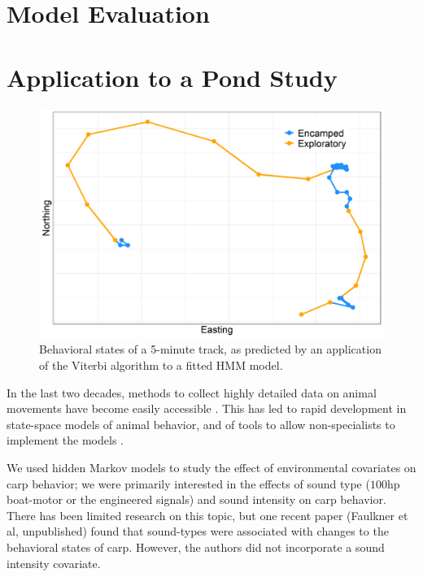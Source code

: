 \documentclass[12pt]{article}
\begin{document}
	\section{Model Evaluation}
	
	\section{Application to a Pond Study} \label{sec:pond_study}
	
	\begin{figure}
		\includegraphics[width=\textwidth]{track_states.png}
		\caption{Behavioral states of a 5-minute track, as predicted by an application of the Viterbi algorithm to a fitted HMM model.}
		\label{img:track_states}
	\end{figure}
	
	In the last two decades, methods to collect highly detailed data on animal movements have become easily accessible \cite{McConnell2010, Tomkiewicz2010}. This has led to rapid development in state-space models of animal behavior, and of tools to allow non-specialists to implement the models \cite{Johnson2008, McClintock2012, Michelot2016, Whoriskey2017, McClintock2018}.
	
	We used hidden Markov models to study the effect of environmental covariates on carp behavior; we were primarily interested in the effects of sound type ($100$hp boat-motor or the engineered signals) and sound intensity on carp behavior. There has been limited research on this topic, but one recent paper (Faulkner et al, unpublished) found that sound-types were associated with changes to the behavioral states of carp. However, the authors did not incorporate a sound intensity covariate.
	
\end{document}

